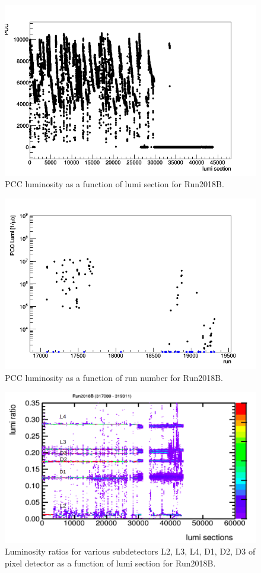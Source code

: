 \begin{figure}[H]
  \centering
  \includegraphics[width=0.52\columnwidth]{./ls_lumi_2018B.png}
  \caption{PCC luminosity as a function of lumi section for Run2018B.}
  \label{fig:CMS}
\end{figure}


\begin{figure}[H]
  \centering
  \includegraphics[width=0.52\columnwidth]{./runs_2018B.png}
  \caption{PCC luminosity as a function of run number for Run2018B.}
  \label{fig:CMS}
\end{figure}


\begin{figure}[H]
  \centering
  \includegraphics[width=0.52\columnwidth]{./2018B_lumiratio.png}
  \caption{Luminosity ratios for various subdetectors L2, L3, L4, D1, D2, D3 of pixel detector as a function of lumi section for Run2018B.}
  \label{fig:CMS}
\end{figure}



